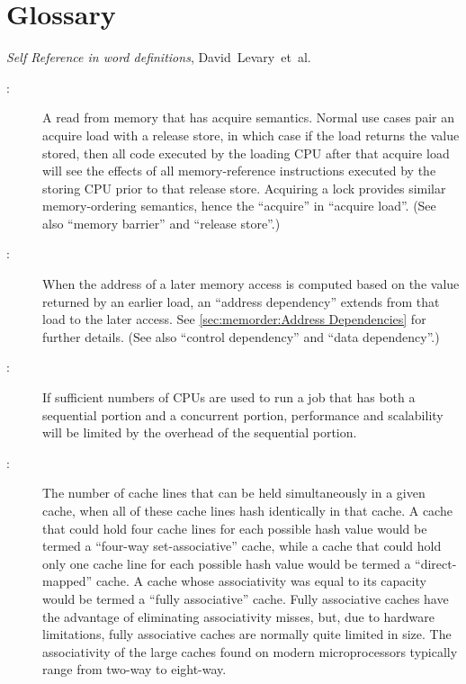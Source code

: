 
\chapter{Glossary}
%
	 {\emph{Self Reference in word definitions},
	        David~Levary~et~al.}

\begin{description}
\item[:]
	A read from memory that has acquire semantics.
	Normal use cases pair an acquire load with a release store,
	in which case if the load returns the value stored, then all
	code executed by the loading CPU after that acquire load will
	see the effects of all memory-reference instructions executed
	by the storing CPU prior to that release store.
	Acquiring a lock provides similar memory-ordering semantics,
	hence the ``acquire'' in ``acquire load''.
	(See also ``memory barrier'' and ``release store''.)
\item[:]
	When the address of a later memory access is computed based on
	the value returned by an earlier load, an ``address dependency''
	extends from that load to the later access.
	See \cref{sec:memorder:Address Dependencies} for further details.
	(See also ``control dependency'' and ``data dependency''.)
\item[:]
	If sufficient numbers of CPUs are used to run a job that has both
	a sequential portion and a concurrent portion, performance and
	scalability will be limited by the overhead of the sequential
	portion.
\item[:]
	The number of cache lines that can be held simultaneously in
	a given cache, when all of these cache lines hash identically
	in that cache.
	A cache that could hold four cache lines for each possible
	hash value would be termed a ``four-way set-associative'' cache,
	while a cache that could hold only one cache line for each
	possible hash value would be termed a ``direct-mapped'' cache.
	A cache whose associativity was equal to its capacity would
	be termed a ``fully associative'' cache.
	Fully associative caches have the advantage of eliminating
	associativity misses, but, due to hardware limitations,
	fully associative caches are normally quite limited in size.
	The associativity of the large caches found on modern microprocessors
	typically range from two-way to eight-way.

\end{description}
